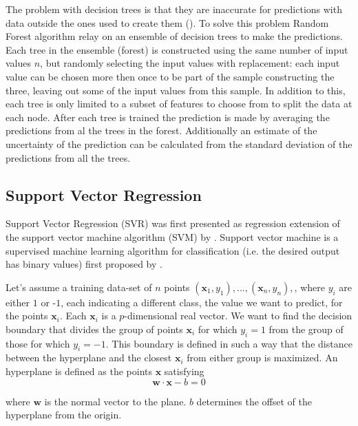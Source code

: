 The problem with decision trees is that they are inaccurate for predictions with data outside the ones used to create them (\cite{hastie01statisticallearning}).
To solve this problem Random Forest algorithm relay on an ensemble of decision trees to make the predictions. Each tree in the ensemble (forest) is constructed using the same number of input values $n$, but randomly selecting the input values with replacement: each input value can be chosen more then once to be part of the sample constructing the three, leaving out some of the input values from this sample. In addition to this, each tree is only limited to a subset of features to choose from to split the data at each node. After each tree is trained the prediction is made by averaging the predictions from al the trees in the forest. Additionally an estimate of the uncertainty of the prediction can be calculated from the standard deviation of the predictions from all the trees.



\subsection{Support Vector Regression}\label{support-vector}
Support Vector Regression (SVR) was first presented as regression extension of the support vector machine algorithm (SVM) by \citet{SVR1997}. Support vector machine is a supervised machine learning algorithm for classification (i.e. the desired output has binary values) first proposed by \citet{SVM1964}.

Let's assume a training data-set of $n$ points ${({\mathbf {x}}_{1},y_{1}),\ldots ,({\mathbf {x}}_{n},y_{n}),}$, where $y_{i}$ are either $1$ or -$1$, each indicating a different class, the value we want to predict, for the points ${\mathbf {x}}_{i}$. Each ${\mathbf {x}_{i}}$ is a $p$-dimensional real vector. We want to find the decision boundary that divides the group of points $\mathbf {x}_{i}$ for which $y_{i}=1$ from the group of those for which $y_{i}=-1$. This boundary is defined in such a way that the distance between the hyperplane and the closest ${\mathbf {x}}_{i}$ from either group is maximized.
An hyperplane is defined as the points ${\mathbf {x}}$ satisfying 
\begin{equation}\label{eq:svm}
\mathbf {w}\cdot \mathbf {x}-b=0
\end{equation}

where $\mathbf {w}$ is the normal vector to the plane. $b$ determines the offset of the hyperplane from the origin.


